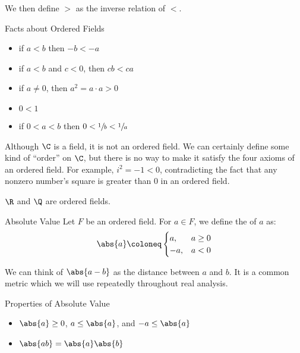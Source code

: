 We then define $>$ as the inverse relation of $<$.

\begin{thmbox}{Facts about Ordered Fields}{}
    \begin{itemize}[noitemsep]
        \item if $a < b$ then $-b < -a$
        \item if $a < b$ and $c < 0$, then $cb < ca$
        \item if $a \neq 0$, then $a^2 = a \cdot a > 0$
        \item $0 < 1$
        \item if $0<a<b$ then $0 < \sfrac{1}{b} < \sfrac{1}{a}$
    \end{itemize}
\end{thmbox}

Although $\C$ is a field, it is not an ordered field. We can certainly define some kind of ``order'' on $\C$, but there is no way to make it satisfy the four axioms of an ordered field. For example, $i^2 = -1 < 0$, contradicting the fact that any nonzero number's square is greater than $0$ in an ordered field.

$\R$ and $\Q$ are ordered fields.

\begin{dfnbox}{Absolute Value}{}
    Let $F$ be an ordered field. For $a \in F$, we define the  of $a$ as:
    \[ \abs{a} \coloneq \begin{cases} a, & a \geq 0 \\ -a, & a < 0 \end{cases} \]
\end{dfnbox}

We can think of $\abs{a-b}$ as the distance between $a$ and $b$.
It is a common metric which we will use repeatedly throughout real analysis.

\begin{thmbox}{Properties of Absolute Value}{}
    \begin{itemize}
        \item $\abs{a} \geq 0$, $a \leq \abs{a}$, and $-a \leq \abs{a}$
        \item $\abs{ab} = \abs{a}\abs{b}$
    \end{itemize}
\end{thmbox}

